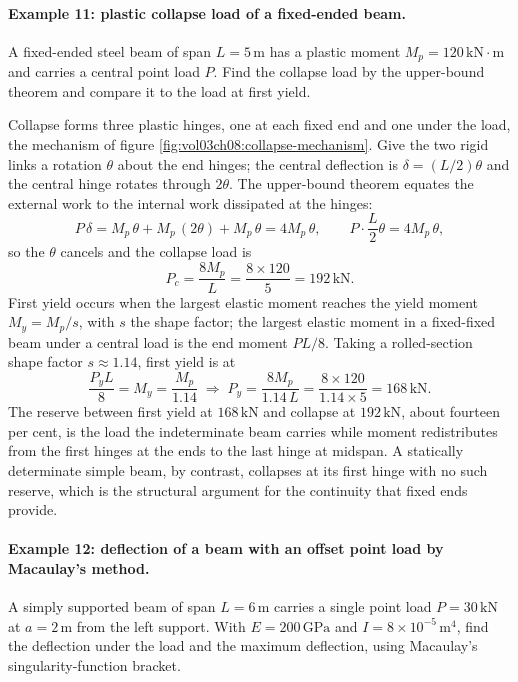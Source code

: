 \paragraph{Example 11: plastic collapse load of a fixed-ended beam.}
A fixed-ended steel beam of span $L = 5\,\si{\meter}$ has a plastic
moment $M_p = 120\,\text{kN}\cdot\text{m}$ and carries a central point
load $P$. Find the collapse load by the upper-bound theorem and compare
it to the load at first yield.

Collapse forms three plastic hinges, one at each fixed end and one under
the load, the mechanism of figure
\ref{fig:vol03ch08:collapse-mechanism}. Give the two rigid links a
rotation $\theta$ about the end hinges; the central deflection is
$\delta = (L/2)\theta$ and the central hinge rotates through $2\theta$.
The upper-bound theorem equates the external work to the internal work
dissipated at the hinges:
\[
P\,\delta = M_p\,\theta + M_p\,(2\theta) + M_p\,\theta = 4 M_p\,\theta,
\qquad
P \cdot \frac{L}{2}\theta = 4 M_p\,\theta,
\]
so the $\theta$ cancels and the collapse load is
\[
P_c = \frac{8 M_p}{L} = \frac{8 \times 120}{5} = 192\,\text{kN}.
\]
First yield occurs when the largest elastic moment reaches the yield
moment $M_y = M_p/s$, with $s$ the shape factor; the largest elastic
moment in a fixed-fixed beam under a central load is the end moment
$PL/8$. Taking a rolled-section shape factor $s \approx 1.14$, first
yield is at
\[
\frac{P_y L}{8} = M_y = \frac{M_p}{1.14}
\;\Rightarrow\;
P_y = \frac{8 M_p}{1.14\,L} = \frac{8 \times 120}{1.14 \times 5}
= 168\,\text{kN}.
\]
The reserve between first yield at $168\,\text{kN}$ and collapse at
$192\,\text{kN}$, about fourteen per cent, is the load the indeterminate
beam carries while moment redistributes from the first hinges at the
ends to the last hinge at midspan. A statically determinate simple beam,
by contrast, collapses at its first hinge with no such reserve, which is
the structural argument for the continuity that fixed ends provide.





\paragraph{Example 12: deflection of a beam with an offset point load by
Macaulay's method.} A simply supported beam of span $L = 6\,\si{\meter}$
carries a single point load $P = 30\,\text{kN}$ at $a = 2\,\si{\meter}$
from the left support. With $E = 200\,\text{GPa}$ and $I = 8 \times
10^{-5}\,\si{\meter\tothe{4}}$, find the deflection under the load and
the maximum deflection, using Macaulay's singularity-function bracket.

